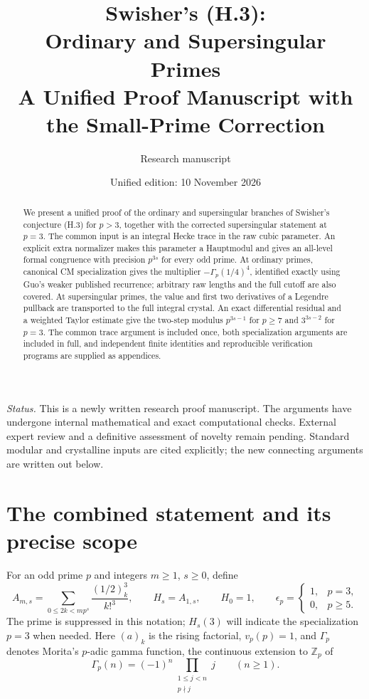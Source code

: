 \documentclass[11pt,a4paper]{article}
\title{Swisher's (H.3):\\ Ordinary and Supersingular Primes\\[7pt]
\large A Unified Proof Manuscript with the Small-Prime Correction}
\author{Research manuscript}
\date{Unified edition: 10 November 2026}
\begin{document}
\maketitle
\begin{abstract}
We present a unified proof of the ordinary and supersingular branches of
Swisher's conjecture (H.3) for $p>3$, together with the corrected
supersingular statement at $p=3$. The common input is an integral Hecke
trace in the raw cubic parameter. An explicit extra normalizer makes
this parameter a Hauptmodul and gives an all-level formal congruence
with precision $p^{3s}$ for every odd prime. At ordinary primes,
canonical CM specialization gives the multiplier
$-\Gamma_p(1/4)^4$, identified exactly using Guo's weaker published
recurrence; arbitrary raw lengths and the full cutoff are also covered.
At supersingular primes, the value and first two derivatives of a
Legendre pullback are transported to the full integral crystal. An
exact differential residual and a weighted Taylor estimate give the
two-step modulus $p^{3s-1}$ for $p\ge7$ and $3^{3s-2}$ for $p=3$.
The common trace argument is included once, both specialization arguments
are included in full, and independent finite identities and reproducible
verification programs are supplied as appendices.
\end{abstract}
\noindent\textit{Status.} This is a newly written research proof manuscript.
The arguments have undergone internal mathematical and exact computational
checks. External expert review and a definitive assessment of novelty
remain pending. Standard modular and crystalline inputs are cited
explicitly; the new connecting arguments are written out below.
\setcounter{tocdepth}{1}
\tableofcontents
\clearpage

\section{The combined statement and its precise scope}\label{sec:statement}

For an odd prime $p$ and integers $m\ge1$, $s\ge0$, define
\[
 A_{m,s}=\sum_{0\le2k<mp^s}\frac{(1/2)_k^3}{k!^3},
 \qquad H_s=A_{1,s},\qquad H_0=1,
 \qquad
 \epsilon_p=\begin{cases}1,&p=3,\\0,&p\ge5.\end{cases}
\]
The prime is suppressed in this notation; $H_s(3)$ will indicate the
specialization $p=3$ when needed. Here $(a)_k$ is the rising factorial,
$v_p(p)=1$, and $\Gamma_p$ denotes Morita's $p$-adic gamma function,
the continuous extension to $\mathbb Z_p$ of
\[
 \Gamma_p(n)=(-1)^n\prod_{\substack{1\le j<n\\p\nmid j}}j
 \qquad(n\ge1).
\]
\end{document}
